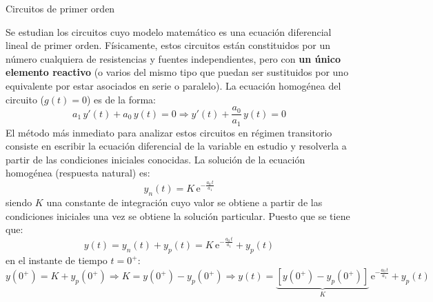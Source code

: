 \documentclass[11pt]{book} %
\makeatletter
\numberwithin{dummy}{section}
\theoremstyle{ocrenumbox}
\theoremstyle{blacknumex}
\theoremstyle{blacknumbox}
\theoremstyle{ocrenum}
\renewcommand{\section}{\@startsection{section}{1}{\z@}
{-4ex \@plus -1ex \@minus -.4ex}
{1ex \@plus.2ex }
{\normalfont\large\sffamily\bfseries}}
\newlength\esp
\makeatother
\begin{document}
	
	
	\section{Circuitos de primer orden}
	
	Se estudian los circuitos cuyo modelo matemático es una ecuación diferencial lineal de primer orden. Físicamente, estos circuitos están constituidos por un número cualquiera de resistencias y fuentes independientes, pero con \textbf{un único elemento reactivo} (o varios del mismo tipo que puedan ser sustituidos por uno equivalente por estar asociados en serie o paralelo). La ecuación homogénea del circuito ($g(t)=0$) es de la forma:
	\begin{equation*}
	    a_1\,y'(t)+a_0\,y(t)=0\Rightarrow y'(t)+\dfrac{a_0}{a_1}\,y(t)=0
	\end{equation*}
 	El método más inmediato para analizar estos circuitos en régimen transitorio consiste en escribir la ecuación diferencial de la variable en estudio y resolverla a partir de las condiciones iniciales conocidas. %
	La solución de la ecuación homogénea ({respuesta natural}) es: 
	\begin{equation}\label{eq.respuesta_natural_1}
	   \boxed{y_n(t)=K\,\mathrm{e}^{-\frac{a_0\,t}{a_1}}}
	\end{equation}
	siendo $K$ una constante de integración cuyo valor se obtiene a partir de las condiciones iniciales una vez se obtiene la solución particular. Puesto que se tiene que:
	\begin{equation*}
	    y(t)=y_n(t)+y_p(t)=K\,\mathrm{e}^{-\frac{a_0\,t}{a_1}}+y_p(t)
	\end{equation*}
	en el instante de tiempo $t=0^+$: 
	\begin{equation}\label{eq.ecuacion_1orden}
	    y(0^+)=K+y_p(0^+)\Rightarrow K=y(0^+)-y_p(0^+)\Rightarrow \boxed{y(t)=\underbrace{\left[y(0^+)-y_p(0^+) \right]}_{K}\,\mathrm{e}^{-\frac{a_0\,t}{a_1}}+y_p(t)}
	\end{equation}
\end{document}
